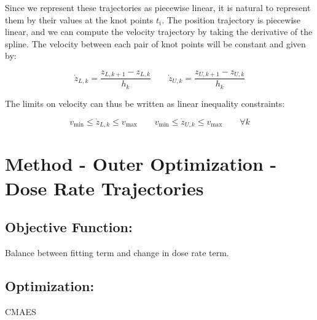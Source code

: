 Since we represent these trajectories as piecewise linear,
it is natural to represent them by their values at the knot points $t_i$.
The position trajectory is piecewise linear,
and we can compute the velocity trajectory by taking the derivative of the spline.
The velocity between each pair of knot points will be constant and given by:

\begin{equation}
  \dot{z}_{L, k} = \frac{z_{L, k+1} - z_{L, k}}{h_k}
  \quad \quad
  \dot{z}_{U, k} = \frac{z_{U, k+1} - z_{U, k}}{h_k}
\end{equation}

The limits on velocity can thus be written as linear inequality constraints:

\begin{equation}
  v_\text{min} \leq \dot{z}_{L, k} \leq v_\text{max}
  \quad \quad
  v_\text{min} \leq \dot{z}_{U, k} \leq v_\text{max}
  \quad \quad \forall k
\end{equation}





\section{Method - Outer Optimization - Dose Rate Trajectories}


\subsection{Objective Function:}

Balance between fitting term and change in dose rate term.


\subsection{Optimization:}

CMAES

